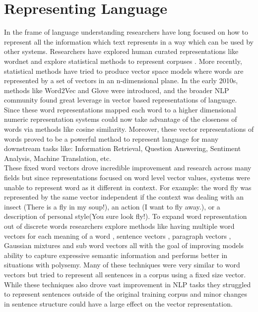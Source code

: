 \section{Representing Language}
In the frame of language understanding researchers have long focused on how to represent all the information which text represents in a way which can be used by other systems. Researchers have explored human curated representations like wordnet \cite{Miller1992WordNetAL}  and explore statistical methods to represent corpuses \cite{Leacock1993TowardsBC}. More recently, statistical methods have tried to produce vector space models where words are represented by a set of vectors in an n-dimensional plane. In the early 2010s, methods like Word2Vec \cite{Mikolov2013EfficientEO} and Glove \cite{Pennington2014GloveGV} were introduced, and the broader NLP community found great leverage in vector based representations of language. Since these word representations mapped each word to a higher dimensional numeric representation systems could now take advantage of the closeness of words via methods like cosine similarity. Moreover, these vector representations of words proved to be a powerful method to represent language for many downstream tasks like: Information Retrieval, Question Answering, Sentiment Analysis, Machine Translation, etc. \\ 
These fixed word vectors drove incredible improvement and research across many fields but since representations focused on word level vector values, systems were unable to represent word as it different in context. For example: the word fly was represented by the same vector independent if the context was dealing with an insect (There is a fly in my soup!), an action (I want to fly away.), or a description of personal style(You sure look fly!). To expand word representation out of discrete words researchers explore methods like having multiple word vectors for each meaning of a word \cite{Hu2016DifferentCL}, sentence vectors \cite{Kiros2015SkipThoughtV}, paragraph vectors \cite{Le2014DistributedRO}, Gaussian mixtures \cite{Athiwaratkun2017MultimodalWD}  and sub word vectors \cite{Bojanowski2017EnrichingWV} all with the goal of improving models ability to capture expressive semantic information and performs better in situations with polysemy. Many of these techniques were very similar to word vectors but tried to represent all sentences in a corpus using a fixed size vector. While these techniques also drove vast improvement in NLP tasks they struggled to represent sentences outside of the original training corpus and minor changes in sentence structure could have a large effect on the vector representation. \\

